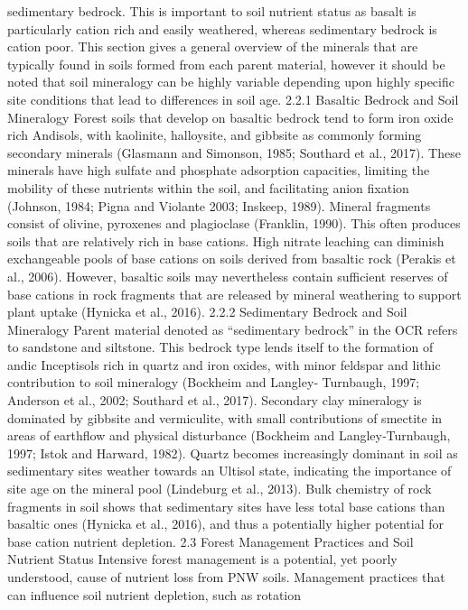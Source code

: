 \documentclass{article}
\begin{document}
sedimentary bedrock. This is important to soil nutrient status as basalt is particularly cation rich
and easily weathered, whereas sedimentary bedrock is cation poor. This section gives a general
overview of the minerals that are typically found in soils formed from each parent material,
however it should be noted that soil mineralogy can be highly variable depending upon highly
specific site conditions that lead to differences in soil age.
2.2.1 Basaltic Bedrock and Soil Mineralogy
Forest soils that develop on basaltic bedrock tend to form iron oxide rich Andisols, with
kaolinite, halloysite, and gibbsite as commonly forming secondary minerals (Glasmann and
Simonson, 1985; Southard et al., 2017). These minerals have high sulfate and phosphate
adsorption capacities, limiting the mobility of these nutrients within the soil, and facilitating
anion fixation (Johnson, 1984; Pigna and Violante 2003; Inskeep, 1989). Mineral fragments
consist of olivine, pyroxenes and plagioclase (Franklin, 1990). This often produces soils that are
relatively rich in base cations. High nitrate leaching can diminish exchangeable pools of base
cations on soils derived from basaltic rock (Perakis et al., 2006). However, basaltic soils may
nevertheless contain sufficient reserves of base cations in rock fragments that are released by
mineral weathering to support plant uptake (Hynicka et al., 2016).
2.2.2 Sedimentary Bedrock and Soil Mineralogy
Parent material denoted as “sedimentary bedrock” in the OCR refers to sandstone and siltstone.
This bedrock type lends itself to the formation of andic Inceptisols rich in quartz and iron oxides,
with minor feldspar and lithic contribution to soil mineralogy (Bockheim and Langley‐
Turnbaugh, 1997; Anderson et al., 2002; Southard et al., 2017). Secondary clay mineralogy is
dominated by gibbsite and vermiculite, with small contributions of smectite in areas of
earthflow and physical disturbance (Bockheim and Langley‐Turnbaugh, 1997; Istok and
Harward, 1982). Quartz becomes increasingly dominant in soil as sedimentary sites weather
towards an Ultisol state, indicating the importance of site age on the mineral pool (Lindeburg et
al., 2013). Bulk chemistry of rock fragments in soil shows that sedimentary sites have less total
base cations than basaltic ones (Hynicka et al., 2016), and thus a potentially higher potential for
base cation nutrient depletion.
2.3 Forest Management Practices and Soil Nutrient Status
Intensive forest management is a potential, yet poorly understood, cause of nutrient loss from
PNW soils. Management practices that can influence soil nutrient depletion, such as rotation
\end{document}
